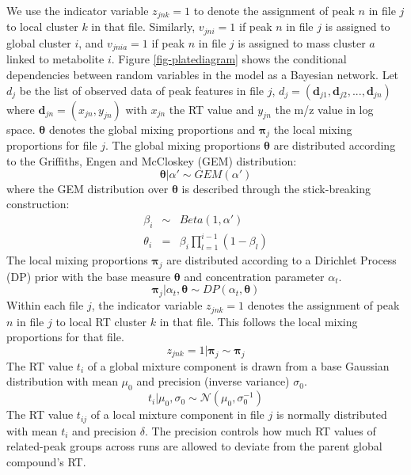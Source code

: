We use the indicator variable $z_{jnk}=1$ to denote the assignment of peak $n$ in file $j$ to local cluster $k$ in that file. Similarly, $v_{jni}=1$ if peak $n$ in file $j$ is assigned to global cluster $i$, and $v_{jnia}=1$ if peak $n$ in file $j$ is assigned to mass cluster $a$ linked to metabolite $i$. Figure \ref{fig-platediagram} shows the conditional dependencies between random variables in the model as a Bayesian network. Let $d_{j}$ be the list of observed data of peak features in file $j$, $d_{j}=(\mathbf{d}_{j1},\mathbf{d}_{j2},...,\mathbf{d}_{jn})$ where $\mathbf{d}_{jn}=(x_{jn},y_{jn})$ with $x_{jn}$ the RT value and $y_{jn}$ the m/z value in log space. $\boldsymbol{\theta}$ denotes the global mixing proportions and $\boldsymbol{\pi}_{j}$ the local mixing proportions for file $j$. The global mixing proportions $\boldsymbol{\theta}$ are distributed according to the Griffiths, Engen and McCloskey (GEM) distribution:
\begin{equation}
    \boldsymbol{\theta}|\alpha'\sim GEM(\alpha')
\end{equation}
where the GEM distribution over $\boldsymbol{\theta}$ is described through the stick-breaking construction: 
\begin{eqnarray}
	\beta_{i} & \sim & Beta(1,\alpha')\\
	\theta_{i} & = & \beta_{i}\prod_{l=1}^{i-1}(1-\beta_{l})
\end{eqnarray}
The local mixing proportions $\boldsymbol{\pi}_{j}$ are distributed according to a Dirichlet Process (DP) prior with the base measure $\boldsymbol{\theta}$ and concentration parameter $\alpha_{t}$. 
\begin{equation}
	\boldsymbol{\pi}_{j}|\alpha_{t},\boldsymbol{\theta}\sim DP(\alpha_{t},\boldsymbol{\theta})
\end{equation}
Within each file $j$, the indicator variable $z_{jnk}=1$ denotes the assignment of peak $n$ in file $j$ to local RT cluster $k$ in that file. This follows the local mixing proportions for that file.
\begin{equation}
	z_{jnk}=1|\boldsymbol{\pi}_{j}\sim\boldsymbol{\pi}_{j}
\end{equation}
The RT value $t_{i}$ of a global mixture component is drawn from a base Gaussian distribution with mean $\mu_{0}$ and precision (inverse variance) $\sigma_{0}$. 
\begin{equation}
	t_{i}|\mu_{0},\sigma_{0}\sim\mathcal{N}(\mu_{0},\sigma_{0}^{-1})\label{eq:draw_ti}
\end{equation}
The RT value $t_{ij}$ of a local mixture component in file $j$ is normally distributed with mean $t_{i}$ and precision $\delta$. The precision controls how much RT values of related-peak groups across runs are allowed to deviate from the parent global compound's RT. 
